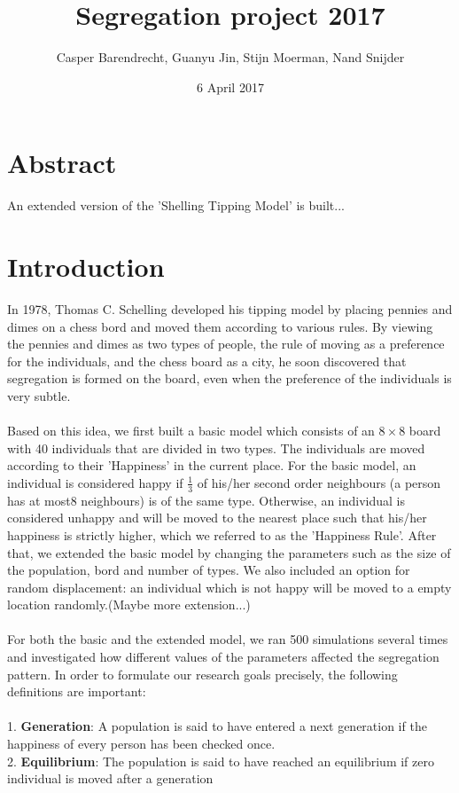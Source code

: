 \documentclass{article}
\title{Segregation project 2017}
\author{Casper Barendrecht, Guanyu Jin, Stijn Moerman, Nand Snijder}
\date{6 April 2017}
\begin{document}
\reversemarginpar 
\maketitle
\section{Abstract}
An extended version of the 'Shelling Tipping Model' is built...
\section{Introduction}
In 1978, Thomas C. Schelling developed his tipping model by placing pennies and dimes on a chess bord and moved them according to various rules. By viewing the pennies and dimes as two types of people, the rule of moving as a preference for the individuals, and the chess board as a city, he soon discovered that segregation is formed on the board, even when the preference of the individuals is very subtle.\\
\\
Based on this idea, we first built a basic model which consists of an \(8\times8\) board with 40 individuals that are divided in two types. The individuals are moved according to their 'Happiness' in the current place. For the basic model, an individual is considered happy if $\frac{1}{3}$ of his/her second order neighbours (a person has at most8 neighbours) is of the same type. Otherwise, an individual is considered unhappy and will be moved to the nearest place such that his/her happiness is strictly higher, which we referred to as the 'Happiness Rule'. After that, we extended the basic model by changing the parameters such as the size of the population, bord and number of types. We also included an option for random displacement: an individual which is not happy will be moved to a empty location randomly.(Maybe more extension...)\\\\
For both the basic and the extended model, we ran 500 simulations several times and investigated how different values of the parameters affected the segregation pattern. In order to formulate our research goals precisely, the following definitions are important:\\
\\
1. \textbf{Generation}: A population is said to have entered a next generation if the happiness of every person has been checked once. \\
2. \textbf{Equilibrium}: The population is said to have reached an equilibrium if zero individual is moved after a generation\\
\end{document}
